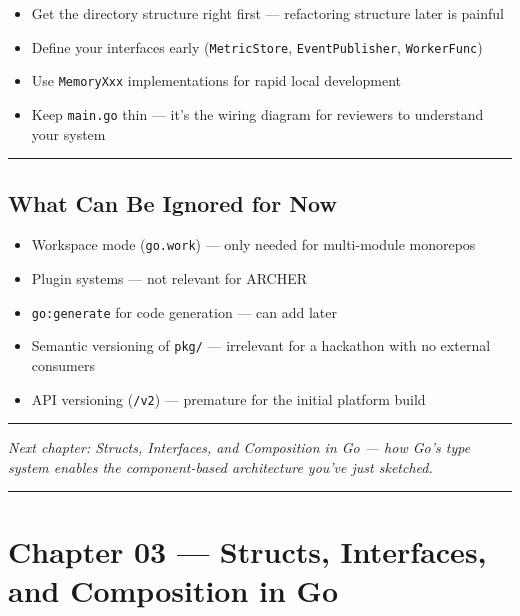 \documentclass[
]{article}
\providecommand{\tightlist}{%
  \setlength{\itemsep}{0pt}\setlength{\parskip}{0pt}}
\begin{document}
\begin{itemize}
\tightlist
\item
  Get the directory structure right first --- refactoring structure
  later is painful
\item
  Define your interfaces early (\texttt{MetricStore},
  \texttt{EventPublisher}, \texttt{WorkerFunc})
\item
  Use \texttt{MemoryXxx} implementations for rapid local development
\item
  Keep \texttt{main.go} thin --- it's the wiring diagram for reviewers
  to understand your system
\end{itemize}

\begin{center}\rule{0.5\linewidth}{0.5pt}\end{center}

\hypertarget{what-can-be-ignored-for-now-1}{%
\subsection{What Can Be Ignored for
Now}\label{what-can-be-ignored-for-now-1}}

\begin{itemize}
\tightlist
\item
  Workspace mode (\texttt{go.work}) --- only needed for multi-module
  monorepos
\item
  Plugin systems --- not relevant for ARCHER
\item
  \texttt{go:generate} for code generation --- can add later
\item
  Semantic versioning of \texttt{pkg/} --- irrelevant for a hackathon
  with no external consumers
\item
  API versioning (\texttt{/v2}) --- premature for the initial platform
  build
\end{itemize}

\begin{center}\rule{0.5\linewidth}{0.5pt}\end{center}

\emph{Next chapter: Structs, Interfaces, and Composition in Go --- how
Go's type system enables the component-based architecture you've just
sketched.}

\begin{center}\rule{0.5\linewidth}{0.5pt}\end{center}

\hypertarget{chapter-03-structs-interfaces-and-composition-in-go}{%
\section{Chapter 03 --- Structs, Interfaces, and Composition in
Go}\label{chapter-03-structs-interfaces-and-composition-in-go}}
\end{document}
